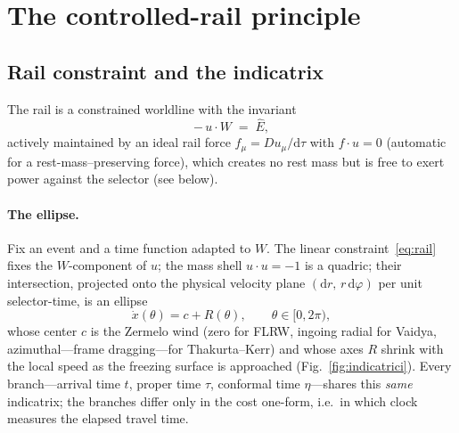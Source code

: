 \documentclass[12pt]{iopart}
\newcommand{\Ehat}{\hat E}
\newcommand{\dd}{\mathrm{d}}
\begin{document}
\section{The controlled-rail principle}
\label{sec:principle}

\subsection{Rail constraint and the indicatrix}
\label{sec:indicatrix}
The rail is a constrained worldline with the invariant
\begin{equation}
    -\,u\cdot W \;=\; \Ehat ,
    \label{eq:rail}
\end{equation}
actively maintained by an ideal rail force $f_\mu=Du_\mu/\dd\tau$ with
$f\cdot u=0$ (automatic for a rest-mass--preserving force), which creates no rest
mass but is free to exert power against the selector (see below).

\paragraph{The ellipse.} Fix an event and a time function adapted to $W$. The
linear constraint~\eqref{eq:rail} fixes the $W$-component of $u$; the mass shell
$u\cdot u=-1$ is a quadric; their intersection, projected onto the physical
velocity plane $(\dd r,\,r\,\dd\varphi)$ per unit selector-time, is an ellipse
\begin{equation}
    \dot x(\theta)=c+R(\theta),\qquad \theta\in[0,2\pi),
    \label{eq:ellipse}
\end{equation}
whose center $c$ is the Zermelo wind (zero for FLRW, ingoing radial for Vaidya,
azimuthal---frame dragging---for Thakurta--Kerr) and whose axes $R$ shrink with
the local speed as the freezing surface is approached (Fig.~\ref{fig:indicatrici}).
Every branch---arrival time $t$, proper time $\tau$, conformal time $\eta$---shares
this \emph{same} indicatrix; the branches differ only in the cost one-form, i.e.\
in which clock measures the elapsed travel time.
\end{document}
